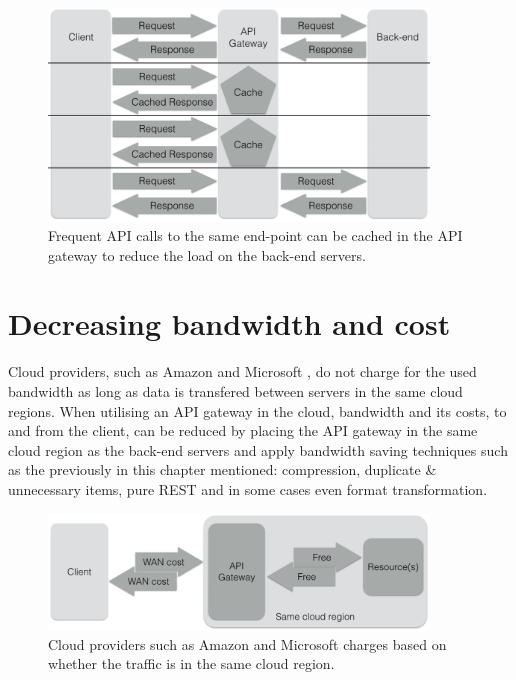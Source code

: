 \documentclass{cslthse-msc}
\begin{document}
\begin{figure}[H]
  \centering
    \begin{center}
      \includegraphics[width=0.9\textwidth]{images/api_gateway_cache.png}
    \end{center}
  \caption{Frequent API calls to the same end-point can be cached in the API gateway to reduce the load on the back-end servers.}
\end{figure}

\section{Decreasing bandwidth and cost}
Cloud providers, such as Amazon \cite{cloud_amazon} and Microsoft \cite{cloud_microsoft}, do not charge for the used bandwidth as long as data is transfered between servers in the same cloud regions. When utilising an API gateway in the cloud, bandwidth and its costs, to and from the client, can be reduced by placing the API gateway in the same cloud region as the back-end servers and apply bandwidth saving techniques such as the previously in this chapter mentioned: compression, duplicate \& unnecessary items, pure REST and in some cases even format transformation.

\begin{figure}[H]
  \centering
    \begin{center}
      \includegraphics[width=0.9\textwidth]{images/api_gateway_bandwidth.png}
    \end{center}
  \caption{Cloud providers such as Amazon \cite{cloud_amazon} and Microsoft \cite{cloud_microsoft} charges based on whether the traffic is in the same cloud region.}
\end{figure}
\end{document}
